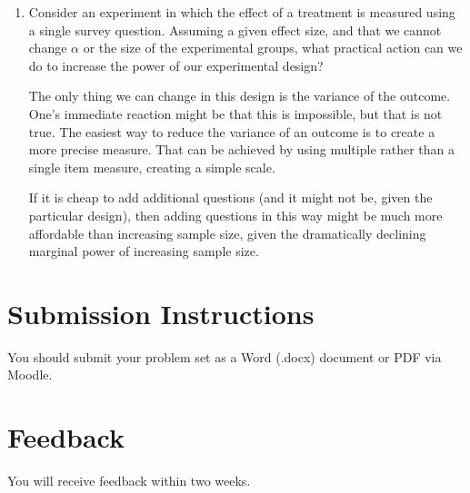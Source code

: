 \documentclass[a4paper]{exam}
\begin{document}
\begin{enumerate}
\begin{enumerate}
	\end{enumerate}

\item Consider an experiment in which the effect of a treatment is measured using a single survey question. Assuming a given effect size, and that we cannot change $\alpha$ or the size of the experimental groups, what practical action can we do to increase the power of our experimental design?

\begin{solution}

The only thing we can change in this design is the variance of the outcome. One's immediate reaction might be that this is impossible, but that is not true. The easiest way to reduce the variance of an outcome is to create a more precise measure. That can be achieved by using multiple rather than a single item measure, creating a simple scale.

If it is cheap to add additional questions (and it might not be, given the particular design), then adding questions in this way might be much more affordable than increasing sample size, given the dramatically declining marginal power of increasing sample size.

\end{solution}

\end{enumerate}

\section{Submission Instructions}\label{submission-instructions}

You should submit your problem set as a Word (.docx) document or PDF via Moodle.

\section{Feedback}\label{feedback}

You will receive feedback within two weeks.
\end{document}
